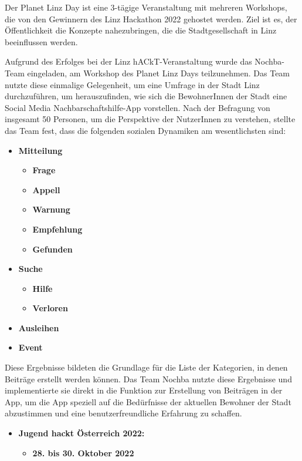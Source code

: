 Der Planet Linz Day \cite{linztourismus} ist eine 3-tägige Veranstaltung mit mehreren Workshops, die von den Gewinnern des Linz Hackathon 2022 gehostet werden. Ziel ist es, der Öffentlichkeit die Konzepte nahezubringen, die die Stadtgesellschaft in Linz beeinflussen werden.

Aufgrund des Erfolges bei der Linz hACkT-Veranstaltung wurde das Nochba-Team eingeladen, am Workshop des Planet Linz Days teilzunehmen. Das Team nutzte diese einmalige Gelegenheit, um eine Umfrage in der Stadt Linz durchzuführen, um herauszufinden, wie sich die BewohnerInnen der Stadt eine Social Media Nachbarschaftshilfe-App vorstellen. Nach der Befragung von insgesamt 50 Personen, um die Perspektive der NutzerInnen zu verstehen,
stellte das Team fest, dass die folgenden sozialen Dynamiken am wesentlichsten sind:


\begin{itemize}
    \item \textbf{Mitteilung}
          \begin{itemize}
              \item \textbf{Frage}
              \item \textbf{Appell}
              \item \textbf{Warnung}
              \item \textbf{Empfehlung}
              \item \textbf{Gefunden}
          \end{itemize}
    \item \textbf{Suche}
          \begin{itemize}
              \item \textbf{Hilfe}
              \item \textbf{Verloren}
          \end{itemize}
    \item \textbf{Ausleihen}
    \item \textbf{Event}
\end{itemize}


Diese Ergebnisse bildeten die Grundlage für die Liste der Kategorien, in denen Beiträge erstellt werden können. Das Team Nochba nutzte diese Ergebnisse und implementierte sie direkt in die Funktion zur Erstellung von Beiträgen in der App, um die App speziell auf die Bedürfnisse der aktuellen Bewohner der Stadt abzustimmen und eine benutzerfreundliche Erfahrung zu schaffen.

\begin{itemize}
    \item \textbf{Jugend hackt Österreich 2022:}
          \begin{itemize}
              \item \textbf{28. bis 30. Oktober 2022}
          \end{itemize}
\end{itemize}

